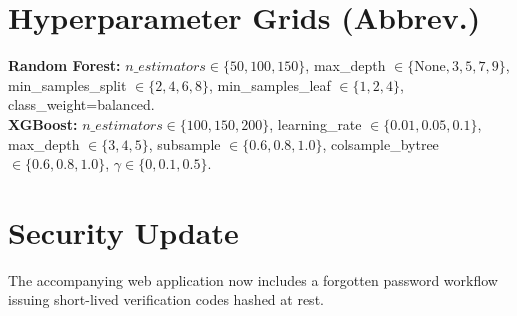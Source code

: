 \documentclass[conference]{IEEEtran}
\begin{document}
\section{Hyperparameter Grids (Abbrev.)}
\textbf{Random Forest:} \(n\_estimators \in \{50,100,150\}\), max\_depth \(\in \{\text{None},3,5,7,9\}\), min\_samples\_split \(\in \{2,4,6,8\}\), min\_samples\_leaf \(\in \{1,2,4\}\), class\_weight=balanced.\\
\textbf{XGBoost:} \(n\_estimators \in \{100,150,200\}\), learning\_rate \(\in \{0.01,0.05,0.1\}\), max\_depth \(\in \{3,4,5\}\), subsample \(\in \{0.6,0.8,1.0\}\), colsample\_bytree \(\in \{0.6,0.8,1.0\}\), \(\gamma \in \{0,0.1,0.5\}\).

\IEEEoverridecommandlockouts
{}
\section{Security Update}
The accompanying web application now includes a forgotten password workflow issuing short-lived verification codes hashed at rest.
\end{document}
